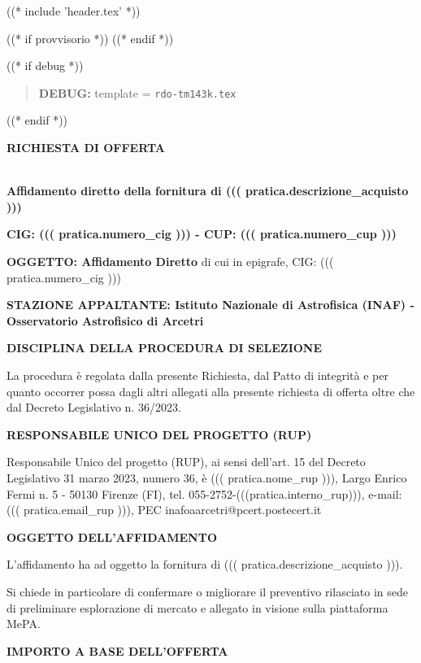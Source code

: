 
((* include 'header.tex' *))

((* if provvisorio *))
((* endif *))



\topaddr

((* if debug *))
\begin{quotation}
	\textbf{DEBUG:} template = \texttt{rdo-tm143k.tex}
\end{quotation}
((* endif *))

\begin{center}
\textbf{RICHIESTA DI OFFERTA}
\end{center}

~\\
\textbf{Affidamento diretto della fornitura di ((( pratica.descrizione_acquisto )))}

\textbf{CIG: ((( pratica.numero_cig ))) - CUP: ((( pratica.numero_cup )))}

\textbf{OGGETTO: Affidamento Diretto} di cui in epigrafe, CIG: ((( pratica.numero_cig )))

\textbf{STAZIONE APPALTANTE: Istituto Nazionale di Astrofisica (INAF) - Osservatorio Astrofisico di Arcetri}

\textbf{DISCIPLINA DELLA PROCEDURA DI SELEZIONE}

La procedura è regolata dalla presente Richiesta, dal Patto di integrità
e per quanto occorrer possa dagli altri allegati alla presente richiesta
di offerta oltre che dal Decreto Legislativo n. 36/2023.


\textbf{RESPONSABILE UNICO DEL PROGETTO (RUP)}

Responsabile Unico del progetto (RUP), ai sensi dell'art. 15 del
Decreto Legislativo 31 marzo 2023, numero 36, è
 ((( pratica.nome_rup ))), Largo Enrico Fermi n. 5 - 50130 Firenze
 (FI), tel. 055-2752-(((pratica.interno_rup))),
e-mail: ((( pratica.email_rup ))), PEC inafoaarcetri@pcert.postecert.it


\textbf{OGGETTO DELL'AFFIDAMENTO}

L'affidamento ha ad oggetto la fornitura di  ((( pratica.descrizione_acquisto ))).

Si chiede in particolare di confermare o migliorare il preventivo
rilasciato in sede di preliminare esplorazione di mercato e allegato in
visione sulla piattaforma MePA.

\textbf{IMPORTO A BASE DELL'OFFERTA}


